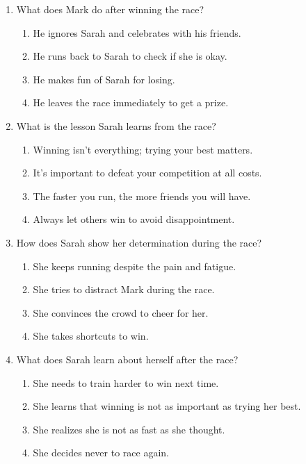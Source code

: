 \documentclass[12pt]{article}
\begin{document}
\begin{enumerate}
\vspace{0.5cm}

\item What does Mark do after winning the race?
\begin{enumerate}[label=\Alph*.]
    \item He ignores Sarah and celebrates with his friends.
    \item He runs back to Sarah to check if she is okay.
    \item He makes fun of Sarah for losing.
    \item He leaves the race immediately to get a prize.
\end{enumerate}

\vspace{0.5cm}

\item What is the lesson Sarah learns from the race?
\begin{enumerate}[label=\Alph*.]
    \item Winning isn’t everything; trying your best matters.
    \item It’s important to defeat your competition at all costs.
    \item The faster you run, the more friends you will have.
    \item Always let others win to avoid disappointment.
\end{enumerate}

\vspace{0.5cm}

\item How does Sarah show her determination during the race?
\begin{enumerate}[label=\Alph*.]
    \item She keeps running despite the pain and fatigue.
    \item She tries to distract Mark during the race.
    \item She convinces the crowd to cheer for her.
    \item She takes shortcuts to win.
\end{enumerate}

\vspace{0.5cm}

\item What does Sarah learn about herself after the race?
\begin{enumerate}[label=\Alph*.]
    \item She needs to train harder to win next time.
    \item She learns that winning is not as important as trying her best.
    \item She realizes she is not as fast as she thought.
    \item She decides never to race again.
\end{enumerate}


\end{enumerate}
\end{document}
